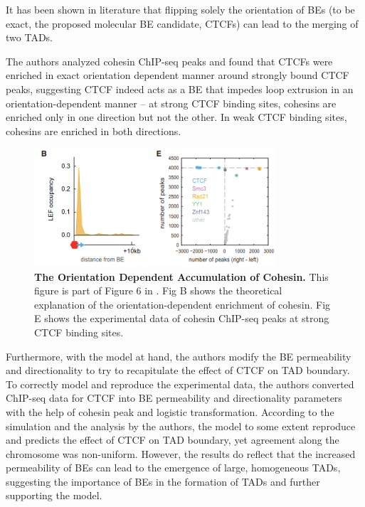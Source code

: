 \documentclass[11pt]{article}
\begin{document}
It has been shown in literature that flipping solely the orientation of BEs (to be exact, the proposed molecular BE candidate, CTCFs) can lead to the merging of two TADs.

The authors analyzed cohesin ChIP-seq peaks and found that CTCFs were enriched in exact orientation dependent manner around strongly bound CTCF peaks, suggesting CTCF indeed acts as a BE that impedes loop extrusion in an orientation-dependent manner -- at strong CTCF binding sites, cohesins are enriched only in one direction but not the other. In weak CTCF binding sites, cohesins are enriched in both directions.

\begin{figure}[htbp]
  \centering
  \includegraphics[width=0.8\textwidth]{assets/Snipaste_2023-01-13_19-41-04.png}
  \caption{\textbf{The Orientation Dependent Accumulation of Cohesin.} This figure is part of Figure 6 in \cite{fudenberg_formation_2016}. Fig B shows the theoretical explanation of the orientation-dependent enrichment of cohesin. Fig E shows the experimental data of cohesin ChIP-seq peaks at strong CTCF binding sites.}
  \label{fig:Exploration of Boundary Elements Properties}
\end{figure}

Furthermore, with the model at hand, the authors modify the BE permeability and directionality to try to recapitulate the effect of CTCF on TAD boundary. To correctly model and reproduce the experimental data, the authors converted ChIP-seq data for CTCF into BE permeability and directionality parameters with the help of cohesin peak and logistic transformation. According to the simulation and the analysis by the authors, the model to some extent reproduce and predicts the effect of CTCF on TAD boundary, yet agreement along the chromosome was non-uniform. However, the results do reflect that the increased permeability of BEs can lead to the emergence of large, homogeneous TADs, suggesting the importance of BEs in the formation of TADs and further supporting the model.
\end{document}

